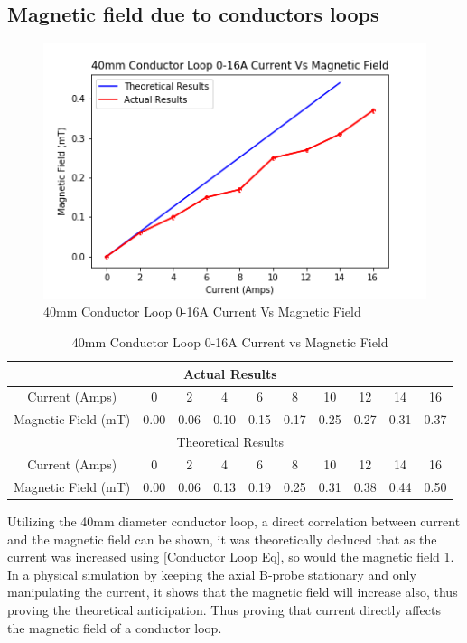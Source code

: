 \documentclass[12pt]{article}
\begin{document}
\subsection{Magnetic field due to conductors loops}
\label{loop seciton}

\begin{figure}[H]
\centering
\includegraphics[scale=0.9]{Images/Conductors/40mm_Conductor_Loop_0-16A_Graph.png}
\caption{40mm Conductor Loop 0-16A Current Vs Magnetic Field}
\label{40mm CL Current Vs Magnetic Field Graph}
\end{figure}
\begin{table}[H]
\begin{center}
 \begin{tabular}{|c||c|c|c|c|c|c|c|c|c|}
 \hline
 \multicolumn{10}{|c|}{Actual Results} \\
 \hline
 Current (Amps) & 0 & 2 & 4 & 6 & 8 & 10 & 12 & 14 & 16 \\
 \hline
 Magnetic Field (mT) & 0.00 & 0.06 & 0.10 & 0.15 & 0.17 & 0.25 & 0.27 & 0.31 & 0.37 \\
 \hline
 \hline
 \multicolumn{10}{|c|}{Theoretical Results} \\
 \hline
 Current (Amps) & 0 & 2 & 4 & 6 & 8 & 10 & 12 & 14 & 16 \\
 \hline
 Magnetic Field (mT) & 0.00 & 0.06 & 0.13 & 0.19 & 0.25 & 0.31 & 0.38 & 0.44 & 0.50 \\
 \hline
 \end{tabular}
 \caption{40mm Conductor Loop 0-16A Current vs Magnetic Field}
 \label{40mm CL Current Vs Magnetic Field Table}
\end{center}
\end{table}

Utilizing the 40mm diameter conductor loop, a direct correlation between current and the magnetic field can be shown, it was theoretically deduced that as the current was increased using \cref{Conductor Loop Eq}, so would the magnetic field \cref{40mm CL Current Vs Magnetic Field Graph}. In a physical simulation by keeping the axial B-probe stationary and only manipulating the current, it shows that the magnetic field will increase also, thus proving the theoretical anticipation. Thus proving that current directly affects the magnetic field of a conductor loop. \\
\end{document}
